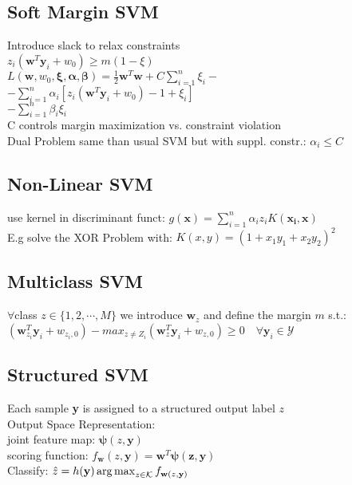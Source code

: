 \subsection*{Soft Margin SVM}
Introduce slack to relax constraints\\
$z_i(\mathbf{w}^T\mathbf{y}_i+w_0)\geq m(1-\xi)$\\
$L(\mathbf{w}, w_0,\mathbf{\xi}, \mathbf{\alpha}, \mathbf{\beta}) {=}\frac{1}{2}\mathbf{w}^T\mathbf{w}+C\sum_{i=1}^n\xi_i-$\\
${-}\sum_{i=1}^n\alpha_i[z_i(\mathbf{w}^T\mathbf{y}_i{+}w_0){-}1{+}\xi_i]$\\
${-}\sum_{i=1}^n\beta_i\xi_i$\\
C controls margin maximization vs. constraint violation\\
Dual Problem same than usual SVM but with suppl. constr.:
$\alpha_i\leq C$

\subsection*{Non-Linear SVM}
use kernel in discriminant funct: $g(\mathbf{x})=\sum_{i=1}^n\alpha_iz_iK(\mathbf{x_i},\mathbf{x})$\\
E.g solve the XOR Problem with:
$K(x,y)=(1+x_1y_1+x_2y_2)^2$

\subsection*{Multiclass SVM}
$\forall$class $z\in\{1,2,\cdots,M\}$ we introduce $\mathbf{w}_z$ and define the margin $m$ s.t.:\\
$(\mathbf{w}_{z_i}^T\mathbf{y}_i+w_{z_i,0})-max_{z\not=Z_i}(\mathbf{w}_z^T\mathbf{y}_i+w_{z,0})\geq 0 \quad \forall\mathbf{y}_i\in \mathcal{Y}$

\subsection*{Structured SVM}
Each sample \textbf{y} is assigned to a structured output label $z$\\
Output Space Representation:\\
joint feature map: $\mathbf{\psi}(z,\mathbf{y})$\\
scoring function: $f_{\mathbf{w}}(z,\mathbf{y})=\mathbf{w}^T\mathbf{\psi(z, \mathbf{y})}$\\
Classify: $\hat{z}=h(\mathbf{y})\operatorname*{arg\,max}_{z\in\mathcal{K}}f_{\mathbf{w}(z, \mathbf{y})}$


